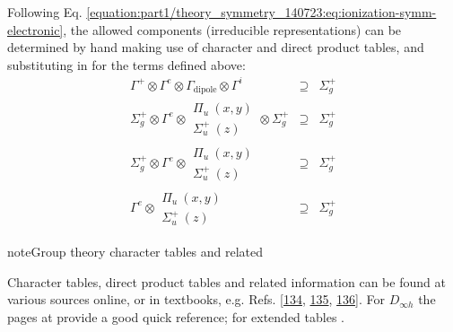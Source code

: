 \documentclass[letterpaper,table,10pt,english]{jupyterBook}
\begin{document}
\sphinxAtStartPar
Following Eq. \eqref{equation:part1/theory_symmetry_140723:eq:ionization-symm-electronic}, the allowed components (irreducible representations) can be determined by hand making use of character and direct product tables, and substituting in for the terms defined above:
\label{equation:part2/sym-fitting-intro_240723:9b2deaa2-c46f-42ac-95c0-6637b79c0f92}\begin{eqnarray}
\Gamma^{+}\otimes\Gamma^{e}\otimes\Gamma_{\mathrm{dipole}}\otimes\Gamma^{i} & \supseteq & \Sigma_{g}^{+}\\
\Sigma_{g}^{+}\otimes\Gamma^{e}\otimes\begin{array}{c}
\Pi_{u}~(x,y)\\
\Sigma_{u}^{+}~(z)
\end{array}\otimes\Sigma_{g}^{+} & \supseteq & \Sigma_{g}^{+}\\
\Sigma_{g}^{+}\otimes\Gamma^{e}\otimes\begin{array}{c}
\Pi_{u}~(x,y)\\
\Sigma_{u}^{+}~(z)
\end{array} & \supseteq & \Sigma_{g}^{+}\\
\Gamma^{e}\otimes\begin{array}{c}
\Pi_{u}~(x,y)\\
\Sigma_{u}^{+}~(z)
\end{array} & \supseteq & \Sigma_{g}^{+}
\end{eqnarray}
\begin{sphinxadmonition}{note}{Group theory character tables and related}

\sphinxAtStartPar
Character tables, direct product tables and related information can be found at various sources online, or in textbooks, e.g. Refs. {[}\hyperlink{cite.backmatter/bibliography:id513}{134}, \hyperlink{cite.backmatter/bibliography:id623}{135}, \hyperlink{cite.backmatter/bibliography:id716}{136}{]}. For \(D_{\infty h}\) the pages at  provide a good quick reference; for extended tables .
\end{sphinxadmonition}
\end{document}
